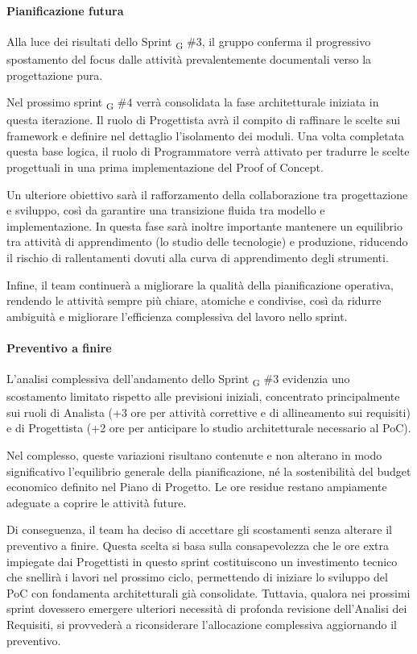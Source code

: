 \documentclass[a4paper, 10pt, colorlinks=true, linkcolor=black, urlcolor=blue, citecolor=blue, hidelinks]{article}
\begin{document}
\paragraph{Pianificazione futura}
Alla luce dei risultati dello Sprint \textsubscript{G} \#3, il gruppo conferma il progressivo spostamento del focus dalle attività prevalentemente documentali verso la progettazione pura.

Nel prossimo sprint \textsubscript{G} \#4 verrà consolidata la fase architetturale iniziata in questa iterazione. Il ruolo di Progettista avrà il compito di raffinare le scelte sui framework e definire nel dettaglio l'isolamento dei moduli. Una volta completata questa base logica, il ruolo di Programmatore verrà attivato per tradurre le scelte progettuali in una prima implementazione del Proof of Concept.

Un ulteriore obiettivo sarà il rafforzamento della collaborazione tra progettazione e sviluppo, così da garantire una transizione fluida tra modello e implementazione. In questa fase sarà inoltre importante mantenere un equilibrio tra attività di apprendimento (lo studio delle tecnologie) e produzione, riducendo il rischio di rallentamenti dovuti alla curva di apprendimento degli strumenti.

Infine, il team continuerà a migliorare la qualità della pianificazione operativa, rendendo le attività sempre più chiare, atomiche e condivise, così da ridurre ambiguità e migliorare l’efficienza complessiva del lavoro nello sprint.

\paragraph{Preventivo a finire}
L’analisi complessiva dell’andamento dello Sprint \textsubscript{G} \#3 evidenzia uno scostamento limitato rispetto alle previsioni iniziali, concentrato principalmente sui ruoli di Analista (+3 ore per attività correttive e di allineamento sui requisiti) e di Progettista (+2 ore per anticipare lo studio architetturale necessario al PoC).

Nel complesso, queste variazioni risultano contenute e non alterano in modo significativo l’equilibrio generale della pianificazione, né la sostenibilità del budget economico definito nel Piano di Progetto. Le ore residue restano ampiamente adeguate a coprire le attività future.

Di conseguenza, il team ha deciso di accettare gli scostamenti senza alterare il preventivo a finire. Questa scelta si basa sulla consapevolezza che le ore extra impiegate dai Progettisti in questo sprint costituiscono un investimento tecnico che snellirà i lavori nel prossimo ciclo, permettendo di iniziare lo sviluppo del PoC con fondamenta architetturali già consolidate. Tuttavia, qualora nei prossimi sprint dovessero emergere ulteriori necessità di profonda revisione dell'Analisi dei Requisiti, si provvederà a riconsiderare l’allocazione complessiva aggiornando il preventivo.
\end{document}
